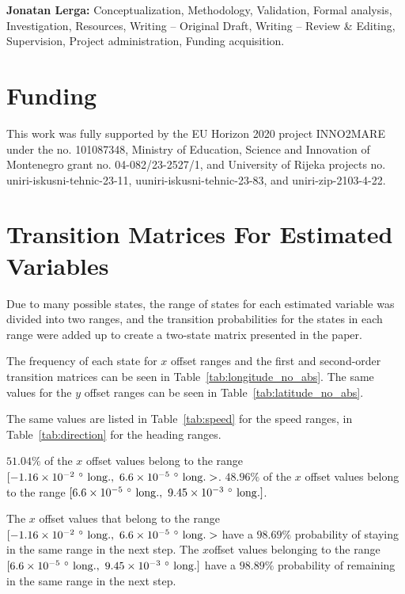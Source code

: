 \documentclass[preprint,12pt]{elsarticle}
\begin{document}
\textbf{Jonatan Lerga:} Conceptualization, Methodology, Validation, Formal analysis, Investigation, Resources, Writing -- Original Draft, Writing -- Review \& Editing, Supervision, Project administration, Funding acquisition.

\section*{Funding}
This work was fully supported by the EU Horizon 2020 project INNO2MARE under the no. 101087348, Ministry of Education, Science and Innovation of Montenegro grant no. 04-082/23-2527/1, and University of Rijeka projects no. uniri-iskusni-tehnic-23-11, uuniri-iskusni-tehnic-23-83, and uniri-zip-2103-4-22.

\appendix
\section{Transition Matrices For Estimated Variables}
\label{sec:Transition}

Due to many possible states, the range of states for each estimated variable was divided into two ranges, and the transition probabilities for the states in each range were added up to create a two-state matrix presented in the paper.

The frequency of each state for $x$ offset ranges and the first and second-order transition matrices can be seen in Table~\ref{tab:longitude_no_abs}. The same values for the $y$ offset ranges can be seen in Table~\ref{tab:latitude_no_abs}.

The same values are listed in Table~\ref{tab:speed} for the speed ranges, in Table~\ref{tab:direction} for the heading ranges.

$51.04\%$ of the $x$ offset values belong to the range $[-1.16 \times 10^{-2} \ \degree \ \mathrm{long.}, \ 6.6 \times 10^{-5} \ \degree \ \mathrm{long.}>$. $48.96\%$ of the $x$ offset values belong to the range $[6.6 \times 10^{-5} \ \degree \ \mathrm{long.}, \ 9.45 \times 10^{-3} \ \degree \ \mathrm{long.}]$. 

The $x$ offset values that belong to the range $[-1.16 \times 10^{-2} \ \degree \ \mathrm{long.}, \ 6.6 \times 10^{-5} \ \degree \ \mathrm{long.}>$ have a $98.69\%$ probability of staying in the same range in the next step. The $x$offset values belonging to the range $[6.6 \times 10^{-5} \ \degree \ \mathrm{long.}, \ 9.45 \times 10^{-3} \ \degree \ \mathrm{long.}]$ have a $98.89\%$ probability of remaining in the same range in the next step.
\end{document}
